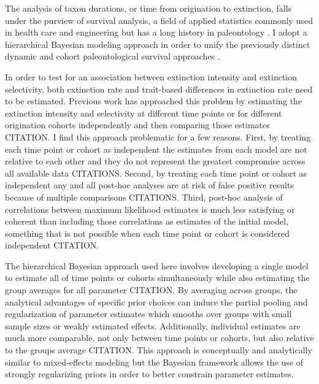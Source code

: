 \documentclass[11pt]{article}
\begin{document}
The analysis of taxon durations, or time from origination to extinction, falls under the purview of survival analysis, a field of applied statistics commonly used in health care and engineering \citep{Klein2003} but has a long history in paleontology \citep{Simpson1944,Simpson1953,VanValen1973,VanValen1979,Smits2015,Crampton2016}. I adopt a hierarchical Bayesian modeling approach \citep{Gelman2007,Gelman2013d} in order to unify the previously distinct dynamic and cohort paleontological survival approaches \citep{VanValen1973,VanValen1979,Raup1978,Raup1975,Foote1988,Baumiller1993,Simpson2006,Crampton2016,Ezard2012b}. 

In order to test for an association between extinction intensity and extinction selectivity, both extinction rate and trait-based differences in extinction rate need to be estimated. Previous work has approached this problem by estimating the extinction intensity and selectivity at different time points or for different origination cohorts independently and then comparing those estimates CITATION. I find this approach problematic for a few reasons. First, by treating each time point or cohort as independent the estimates from each model are not relative to each other and they do not represent the greatest compromise across all available data CITATIONS. Second, by treating each time point or cohort as independent any and all post-hoc analyses are at risk of false positive results because of multiple comparisons CITATIONS. Third, post-hoc analysis of correlations between maximum likelihood estimates is much less satisfying or coherent than including those correlations as estimates of the initial model, something that is not possible when each time point or cohort is considered independent CITATION. 

The hierarchical Bayesian approach used here involves developing a single model to estimate all of time points or cohorts simultaneously while also estimating the group averages for all parameter CITATION. By averaging across groups, the analytical advantages of specific prior choices can induce the partial pooling and regularization of parameter estimates which smooths over groups with small sample sizes or weakly estimated effects. Additionally, individual estimates are much more comparable, not only between time points or cohorts, but also relative to the groups average CITATION. This approach is conceptually and analytically similar to mixed-effects modeling but the Bayesian framework allows the use of strongly regularizing priors in order to better constrain parameter estimates.
\end{document}

